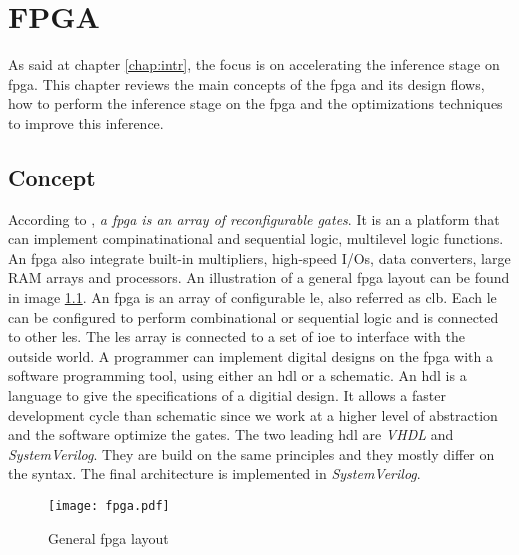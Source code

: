 \chapter{FPGA} \label{chap:fpga}
As said at chapter \ref{chap:intr}, the focus is on accelerating the inference stage on \acrshort{fpga}. This chapter reviews the main concepts of the \acrshort{fpga} and its design flows, how to perform the inference stage on the \acrshort{fpga} and the optimizations techniques to improve this inference.
%
%
\section{Concept}
%
%
According to \textcite{harris_digital_2015}, \textit{a \acrfull{fpga} is an array of reconfigurable gates}. It is an a platform that can implement compinatinational and sequential logic, multilevel logic functions. An \acrshort{fpga} also integrate built-in multipliers, high-speed I/Os, data converters, large RAM arrays and processors. \newline \newline
%
An illustration of a general \acrshort{fpga} layout can be found in image \ref{fig:fpga}. An \acrshort{fpga} is an array of configurable \acrfull{le}, also referred as \acrfull{clb}. Each \acrshort{le} can be configured to perform combinational or sequential logic and is connected to other \acrshort{le}s. The \acrshort{le}s array is connected to a set of \acrfull{ioe} to interface with the outside world.\newline \newline
%
A programmer can implement digital designs on the \acrshort{fpga} with a software programming tool, using either an \acrfull{hdl} or a schematic. An \acrshort{hdl} is a language to give the specifications of a digitial design. It allows a faster development cycle than schematic since we work at a higher level of abstraction and the software optimize the gates. The two leading \acrshort{hdl} are \textit{VHDL} and \textit{SystemVerilog}. They are build on the same principles and they mostly differ on the syntax. The final architecture is implemented in \textit{SystemVerilog}.
%
\begin{figure}
    \texttt{[image: fpga.pdf]}
    \caption{General \acrshort{fpga} layout \cite{harris_digital_2015}}
    \label{fig:fpga}
\end{figure} \newline \newline
%

